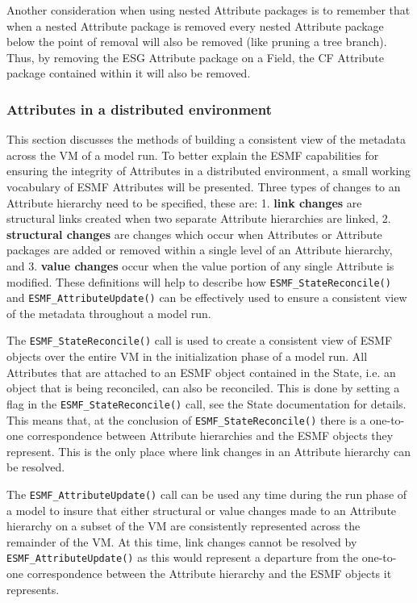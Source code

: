 Another consideration when using nested Attribute packages is to remember that when a nested Attribute package is removed every nested Attribute package below the point of removal will also be removed (like pruning a tree branch).  Thus, by removing the ESG Attribute package on a Field, the CF Attribute package contained within it will also be removed.

\subsubsection{Attributes in a distributed environment}
\label{sec:Att:Dist}

This section discusses the methods of building a consistent view of the metadata across the VM of a model run.  To better explain the ESMF capabilities for ensuring the integrity of Attributes in a distributed environment, a small working vocabulary of ESMF Attributes will be presented.  Three types of changes to an Attribute hierarchy need to be specified, these are: 1. {\bf link changes} are structural links created when two separate Attribute hierarchies are linked, 2. {\bf structural changes} are changes which occur when Attributes or Attribute packages are added or removed within a single level of an Attribute hierarchy, and 3. {\bf value changes} occur when the value portion of any single Attribute is modified.  These definitions will help to describe how {\tt ESMF\_StateReconcile()} and {\tt ESMF\_AttributeUpdate()} can be effectively used to ensure a consistent view of the metadata throughout a model run.

The {\tt ESMF\_StateReconcile()} call is used to create a consistent view of ESMF objects over the entire VM in the initialization phase of a model run.  All Attributes that are attached to an ESMF object contained in the State, i.e. an object that is being reconciled, can also be reconciled.  This is done by setting a flag in the {\tt ESMF\_StateReconcile()} call, see the State documentation for details.  This means that, at the conclusion of {\tt ESMF\_StateReconcile()} there is a one-to-one correspondence between Attribute hierarchies and the ESMF objects they represent.  This is the only place where link changes in an Attribute hierarchy can be resolved.

The {\tt ESMF\_AttributeUpdate()} call can be used any time during the run phase of a model to insure that either structural or value changes made to an Attribute hierarchy on a subset of the VM are consistently represented across the remainder of the VM.  At this time, link changes cannot be resolved by {\tt ESMF\_AttributeUpdate()} as this would represent a departure from the one-to-one correspondence between the Attribute hierarchy and the ESMF objects it represents.  

